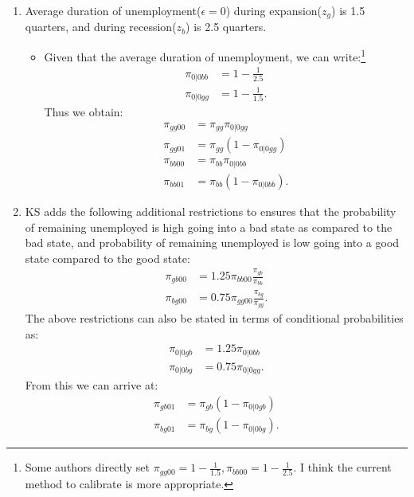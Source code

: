 \documentclass[12pt]{article}
\begin{document}
\begin{enumerate}
\item Average duration of unemployment($\epsilon=0$) during expansion($z_g$) is 1.5 quarters, and during recession($z_b$) is 2.5 quarters.
\begin{itemize}
\item Given that the average duration of unemployment,  we can write:\footnote{Some authors directly set $\pi_{gg00} = 1 -\frac{1}{1.5}, \pi_{bb00} = 1 -\frac{1}{2.5}$. I think the current method to calibrate is more appropriate.}
\begin{align*}
\pi_{0|0 b b} & = 1 -\frac{1}{2.5} \\
\pi_{0|0 g g} & = 1 -\frac{1}{1.5}.
\end{align*}
Thus we obtain:
\begin{align*}
\pi_{gg00} & = \pi_{gg}\pi_{0|0g g} \\
\pi_{gg01} & = \pi_{gg}(1-\pi_{0|0g g})\\
\pi_{bb00} & = \pi_{bb}\pi_{0|0b b} \\
\pi_{bb01} & = \pi_{bb}(1-\pi_{0|0b b}).
\end{align*}
\end{itemize}

\item KS adds the following additional restrictions to ensures that the probability of remaining unemployed is high going into a bad state as compared to the bad state, and probability of remaining unemployed is low going into a good state compared to the good state:
\begin{align*}
\pi_{gb00}& = 1.25 \pi_{bb00}\frac{\pi_{gb}}{\pi_{bb}} \\
\pi_{bg00}& = 0.75 \pi_{gg00}\frac{\pi_{bg}}{\pi_{gg}}.
\end{align*}
The above restrictions can also be stated in terms of conditional probabilities as:
\begin{align*}
\pi_{0|0gb} & = 1.25 \pi_{0|0bb} \\
\pi_{0|0bg} & = 0.75 \pi_{0|0 gg}.
\end{align*}
From this we can arrive at:
\begin{align*}
\pi_{gb01} & = \pi_{gb}(1-\pi_{0|0gb})\\
\pi_{bg01} & = \pi_{bg}(1-\pi_{0|0bg}).
\end{align*}


\end{enumerate}
\end{document}
